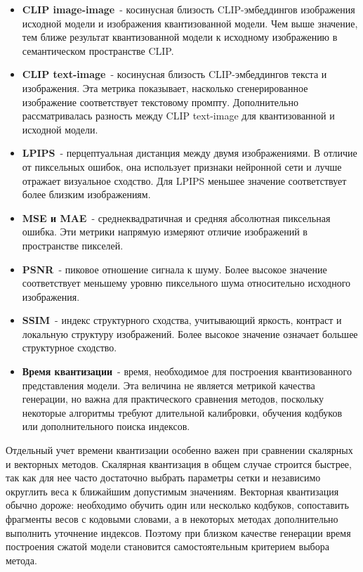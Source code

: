 \documentclass[a4paper,12pt]{article}
\begin{document}
\begin{itemize}
    \item \textbf{CLIP image-image}~- косинусная близость CLIP-эмбеддингов изображения исходной модели и изображения квантизованной модели. Чем выше значение, тем ближе результат квантизованной модели к исходному изображению в семантическом пространстве CLIP.
    \item \textbf{CLIP text-image}~- косинусная близость CLIP-эмбеддингов текста и изображения. Эта метрика показывает, насколько сгенерированное изображение соответствует текстовому промпту. Дополнительно рассматривалась разность между CLIP text-image для квантизованной и исходной модели.
    \item \textbf{LPIPS}~- перцептуальная дистанция между двумя изображениями. В отличие от пиксельных ошибок, она использует признаки нейронной сети и лучше отражает визуальное сходство. Для LPIPS меньшее значение соответствует более близким изображениям.
    \item \textbf{MSE и MAE}~- среднеквадратичная и средняя абсолютная пиксельная ошибка. Эти метрики напрямую измеряют отличие изображений в пространстве пикселей.
    \item \textbf{PSNR}~- пиковое отношение сигнала к шуму. Более высокое значение соответствует меньшему уровню пиксельного шума относительно исходного изображения.
    \item \textbf{SSIM}~- индекс структурного сходства, учитывающий яркость, контраст и локальную структуру изображений. Более высокое значение означает большее структурное сходство.
    \item \textbf{Время квантизации}~- время, необходимое для построения квантизованного представления модели. Эта величина не является метрикой качества генерации, но важна для практического сравнения методов, поскольку некоторые алгоритмы требуют длительной калибровки, обучения кодбуков или дополнительного поиска индексов.
\end{itemize}

Отдельный учет времени квантизации особенно важен при сравнении скалярных и векторных методов. Скалярная квантизация в общем случае строится быстрее, так как для нее часто достаточно выбрать параметры сетки и независимо округлить веса к ближайшим допустимым значениям. Векторная квантизация обычно дороже: необходимо обучить один или несколько кодбуков, сопоставить фрагменты весов с кодовыми словами, а в некоторых методах дополнительно выполнить уточнение индексов. Поэтому при близком качестве генерации время построения сжатой модели становится самостоятельным критерием выбора метода.
\end{document}

